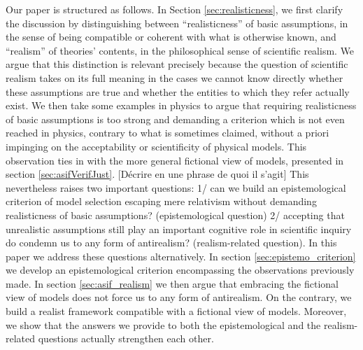 \documentclass[a4paper,11pt]{article}
\theoremstyle{definition}
\begin{document}
Our paper is structured as follows. In Section \ref{sec:realisticness}, we first clarify the discussion by distinguishing between “realisticness” of basic assumptions, in the sense of being compatible or coherent with what is otherwise known, and “realism” of theories’ contents, in the philosophical sense of scientific realism. We argue that this distinction is relevant precisely because the question of scientific realism takes on its full meaning in the cases we cannot know directly whether these assumptions are true and whether the entities to which they refer actually exist. We then take some examples in physics to argue that requiring realisticness of basic assumptions is too strong and demanding a criterion which is not even reached in physics, contrary to what is sometimes claimed, without a priori impinging on the acceptability or scientificity of physical models. This observation ties in with the more general fictional view of models, presented in section \ref{sec:asifVerifJust}. [Décrire en une phrase de quoi il s’agit] This nevertheless raises two important questions: 1/ can we build an epistemological criterion of model selection escaping mere relativism without demanding realisticness of basic assumptions? (epistemological question) 2/ accepting that unrealistic assumptions still play an important cognitive role in scientific inquiry do condemn us to any form of antirealism? (realism-related question). In this paper we address these questions alternatively. In section \ref{sec:epistemo_criterion} we develop an epistemological criterion encompassing the observations previously made. In section \ref{sec:asif_realism} we then argue that embracing the fictional view of models does not force us to any form of antirealism. On the contrary, we build a realist framework compatible with a fictional view of models. Moreover, we show that the answers we provide to both the epistemological and the realism-related questions actually strengthen each other.


\end{document}
